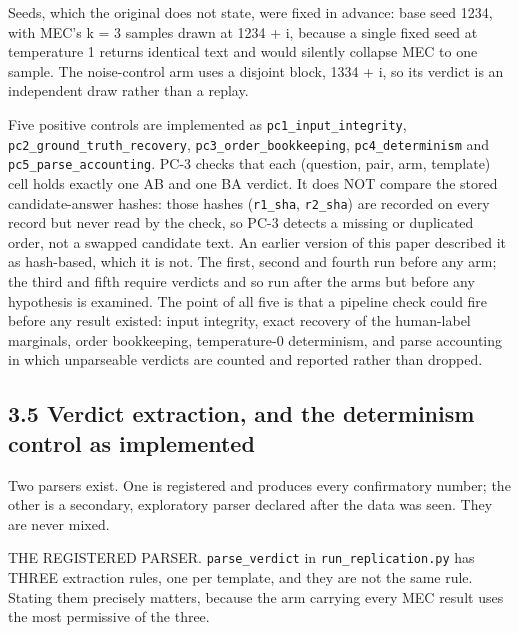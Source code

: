Seeds, which the original does not state, were fixed in advance: base seed 1234, with MEC's k = 3
samples drawn at 1234 + i, because a single fixed seed at temperature 1 returns identical text and
would silently collapse MEC to one sample. The noise-control arm uses a disjoint block, 1334 + i, so
its verdict is an independent draw rather than a replay.

Five positive controls are implemented as \texttt{pc1\_input\_integrity}, \texttt{pc2\_ground\_truth\_recovery},
\texttt{pc3\_order\_bookkeeping}, \texttt{pc4\_determinism} and \texttt{pc5\_parse\_accounting}. PC-3 checks that each
(question, pair, arm, template) cell holds exactly one AB and one BA verdict. It does NOT compare
the stored candidate-answer hashes: those hashes (\texttt{r1\_sha}, \texttt{r2\_sha}) are recorded on every record
but never read by the check, so PC-3 detects a missing or duplicated order, not a swapped candidate
text. An earlier version of this paper described it as hash-based, which it is not. The first, second and
fourth run before any arm; the third and fifth require verdicts and so run after the arms but
before any hypothesis is examined. The point of all five is that a pipeline
check could fire before any result existed: input integrity, exact recovery of the human-label
marginals, order bookkeeping, temperature-0 determinism, and parse
accounting in which unparseable verdicts are counted and reported rather than dropped.

\subsection{3.5 Verdict extraction, and the determinism control as implemented}\label{verdict-extraction-and-the-determinism-control-as-implemented}

Two parsers exist. One is registered and produces every confirmatory number; the other is a
secondary, exploratory parser declared after the data was seen. They are never mixed.

THE REGISTERED PARSER. \texttt{parse\_verdict} in \texttt{run\_replication.py} has THREE extraction rules, one per
template, and they are not the same rule. Stating them precisely matters, because the arm carrying
every MEC result uses the most permissive of the three.

